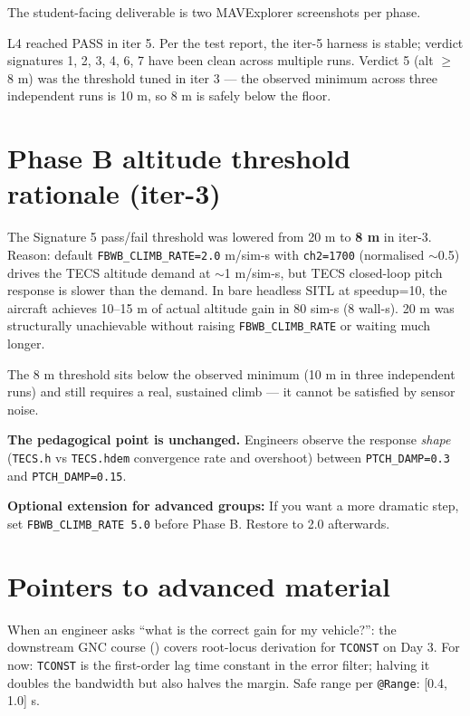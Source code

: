 \documentclass[a4paper,11pt,twoside]{article}
\renewcommand{\insttiming}[1]{\ifinstructor\begin{tcolorbox}[colback=orange!5!white,colframe=orange!50!black,title=Pacing,breakable]#1\end{tcolorbox}\fi}
\renewcommand{\instadvanced}[1]{\ifinstructor\begin{tcolorbox}[colback=violet!5!white,colframe=violet!50!black,title=Advanced material pointer,breakable]#1\end{tcolorbox}\fi}
\begin{document}
The student-facing deliverable is two MAVExplorer screenshots per phase.

\insttiming{L4 reached PASS in iter 5. Per the test report, the iter-5 harness is stable; verdict signatures 1, 2, 3, 4, 6, 7 have been clean across multiple runs. Verdict 5 (alt $\geq$ 8 m) was the threshold tuned in iter 3 --- the observed minimum across three independent runs is 10 m, so 8 m is safely below the floor.}

\section*{Phase B altitude threshold rationale (iter-3)}

The Signature 5 pass/fail threshold was lowered from 20 m to \textbf{8 m} in iter-3. Reason: default \texttt{FBWB\_CLIMB\_RATE=2.0} m/sim-s with \texttt{ch2=1700} (normalised $\sim$0.5) drives the TECS altitude demand at $\sim$1 m/sim-s, but TECS closed-loop pitch response is slower than the demand. In bare headless SITL at speedup=10, the aircraft achieves 10--15 m of actual altitude gain in 80 sim-s (8 wall-s). 20 m was structurally unachievable without raising \texttt{FBWB\_CLIMB\_RATE} or waiting much longer.

The 8 m threshold sits below the observed minimum (10 m in three independent runs) and still requires a real, sustained climb --- it cannot be satisfied by sensor noise.

\textbf{The pedagogical point is unchanged.} Engineers observe the response \emph{shape} (\texttt{TECS.h} vs \texttt{TECS.hdem} convergence rate and overshoot) between \texttt{PTCH\_DAMP=0.3} and \texttt{PTCH\_DAMP=0.15}.

\textbf{Optional extension for advanced groups:} If you want a more dramatic step, set \texttt{FBWB\_CLIMB\_RATE 5.0} before Phase B. Restore to 2.0 afterwards.

\section*{Pointers to advanced material}

\instadvanced{When an engineer asks ``what is the correct gain for my vehicle?'': the downstream GNC course (\siblingplane) covers root-locus derivation for \texttt{TCONST} on Day 3. For now: \texttt{TCONST} is the first-order lag time constant in the error filter; halving it doubles the bandwidth but also halves the margin. Safe range per \texttt{@Range}: [0.4, 1.0] s.}
\end{document}
